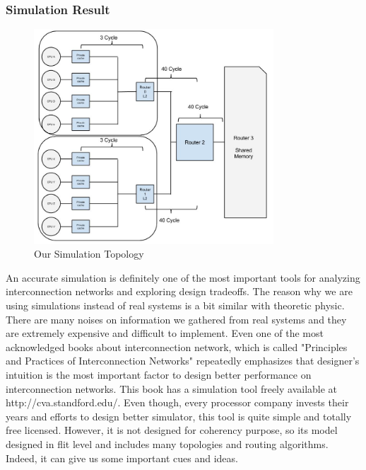 \subsubsection*{Simulation Result}
	\begin{figure}[h!]
	    \centering
	    \includegraphics[width=0.8\textwidth]{img/simulation.jpg}
	    \caption{Our Simulation Topology\cite{0122007514}}
	    \label{fig:simulation}
	\end{figure}
An accurate simulation is definitely one of the most important tools for analyzing interconnection networks and exploring design tradeoffs. The reason why we are using simulations instead of real systems is a bit similar with theoretic physic. There are many noises on information we gathered from real systems and they are extremely expensive and difficult to implement. Even one of the most acknowledged books about interconnection network, which is called "Principles and Practices of Interconnection Networks" repeatedly emphasizes that designer's intuition is the most important factor to design better performance on interconnection networks\cite{0122007514}. This book has a simulation tool freely available at http://cva.standford.edu/. Even though, every processor company invests their years and efforts to design better simulator, this tool is quite simple and totally free licensed. However, it is not designed for coherency purpose, so its model designed in flit level and includes many topologies and routing algorithms. Indeed, it can give us some important cues and ideas. 

